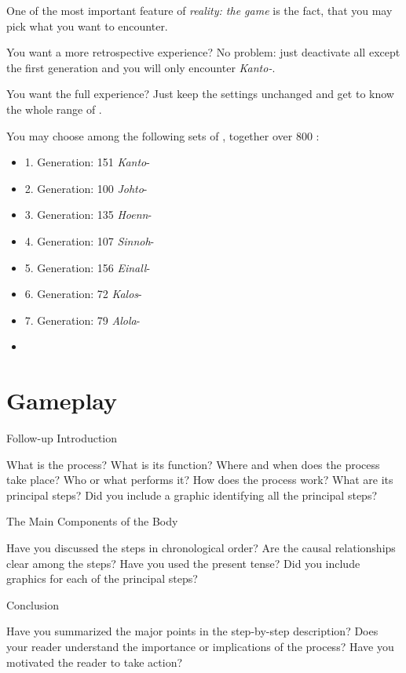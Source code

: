 One of the most important feature of \emph{\poke{} reality: the game} is the fact, that you may pick what \poke{} you want to encounter. 

You want a more retrospective experience? No problem: just deactivate all \poke{} except the first generation and you will only encounter \emph{Kanto-\poke{}}.

You want the full experience? Just keep the settings unchanged and get to know the whole range of \poke{}.

You may choose among the following sets of \poke{}, together over 800 \poke{}:
\begin{multicols}{2}
\begin{itemize}
\item 1. Generation: 151 \emph{Kanto}-\poke{}
\item 2. Generation: 100 \emph{Johto}-\poke{}
\item 3. Generation: 135 \emph{Hoenn}-\poke{}
\item 4. Generation: 107 \emph{Sinnoh}-\poke{}
\item 5. Generation: 156 \emph{Einall}-\poke{}
\item 6. Generation: 72 \emph{Kalos}-\poke{}
\item 7. Generation: 79 \emph{Alola}-\poke{}
\item[]
\end{itemize}
\end{multicols}

\section{Gameplay}

Follow-up Introduction

What is the process?
What is its function?
Where and when does the process take place?
Who or what performs it?   
How does the process work?
What are its principal steps? 
Did you include a graphic identifying all the principal steps? 


 
The Main Components of the Body  
 
Have you discussed the steps in chronological order?
Are the causal relationships clear among the steps?  
Have you used the present tense?  
Did you include graphics for each of the principal steps? 


 
Conclusion

Have you summarized the major points in the step-by-step description?   
 Does your reader understand the importance or implications of the process?
Have you motivated the reader to take action?


